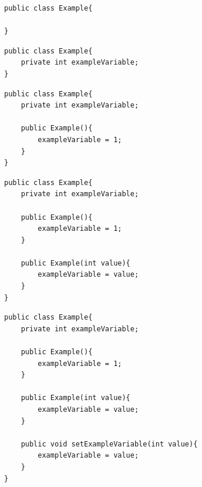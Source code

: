 \documentclass{beamer}
\begin{document}
\begin{frame}[fragile]
\small
\begin{block}{}
\begin{lstlisting}
public class Example{

}
\end{lstlisting}
\end{block}
\end{frame}

\begin{frame}[fragile]
\small
\begin{block}{}
\begin{lstlisting}
public class Example{
	private int exampleVariable;
}
\end{lstlisting}
\end{block}
\end{frame}

\begin{frame}[fragile]
\small
\begin{block}{}
\begin{lstlisting}
public class Example{
	private int exampleVariable;
	
	public Example(){
		exampleVariable = 1;
	}
}
\end{lstlisting}
\end{block}
\end{frame}

\begin{frame}[fragile]
\small
\begin{block}{}
\begin{lstlisting}
public class Example{
	private int exampleVariable;
	
	public Example(){
		exampleVariable = 1;
	}
	
	public Example(int value){
		exampleVariable = value;
	}
}
\end{lstlisting}
\end{block}
\end{frame}

\begin{frame}[fragile]
\small
\begin{block}{}
\begin{lstlisting}
public class Example{
	private int exampleVariable;
	
	public Example(){
		exampleVariable = 1;
	}
	
	public Example(int value){
		exampleVariable = value;
	}
	
	public void setExampleVariable(int value){
		exampleVariable = value;
	}
}
\end{lstlisting}
\end{block}
\end{frame}
\end{document}
